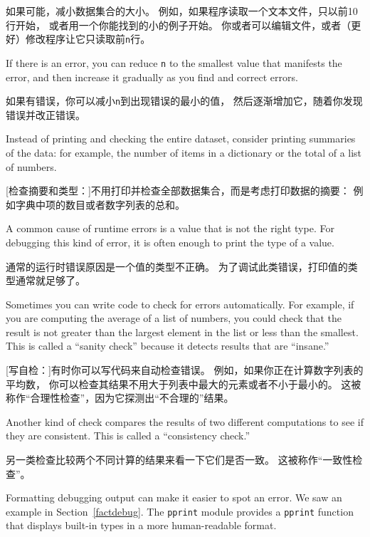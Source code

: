 \documentclass[10pt]{book}
\begin{document}
\begin{CJK}{UTF8}{gbsn}
\begin{description}
[缩小输入：]如果可能，减小数据集合的大小。
例如，如果程序读取一个文本文件，只以前10行开始，
或者用一个你能找到的小的例子开始。
你或者可以编辑文件，或者（更好）修改程序让它只读取前{\tt n}行。

If there is an error, you can reduce {\tt n} to the smallest
value that manifests the error, and then increase it gradually
as you find and correct errors.

如果有错误，你可以减小{\tt n}到出现错误的最小的值，
然后逐渐增加它，随着你发现错误并改正错误。

\item[Check summaries and types:] Instead of printing and checking the
entire dataset, consider printing summaries of the data: for example,
the number of items in a dictionary or the total of a list of numbers.

[检查摘要和类型：]不用打印并检查全部数据集合，而是考虑打印数据的摘要：
例如字典中项的数目或者数字列表的总和。

A common cause of runtime errors is a value that is not the right
type.  For debugging this kind of error, it is often enough to print
the type of a value.

通常的运行时错误原因是一个值的类型不正确。
为了调试此类错误，打印值的类型通常就足够了。

\item[Write self-checks:]  Sometimes you can write code to check
for errors automatically.  For example, if you are computing the
average of a list of numbers, you could check that the result is
not greater than the largest element in the list or less than
the smallest.  This is called a ``sanity check'' because it detects
results that are ``insane.''

[写自检：]有时你可以写代码来自动检查错误。
例如，如果你正在计算数字列表的平均数，
你可以检查其结果不用大于列表中最大的元素或者不小于最小的。
这被称作``合理性检查''，因为它探测出``不合理的''结果。

Another kind of check compares the results of two different
computations to see if they are consistent.  This is called a
``consistency check.''

另一类检查比较两个不同计算的结果来看一下它们是否一致。
这被称作``一致性检查''。

\item[Pretty print the output:] Formatting debugging output
can make it easier to spot an error.  We saw an example in
Section~\ref{factdebug}.  The {\tt pprint} module provides
a {\tt pprint} function that displays built-in types in
a more human-readable format.


\end{description}
\end{CJK}
\end{document}
